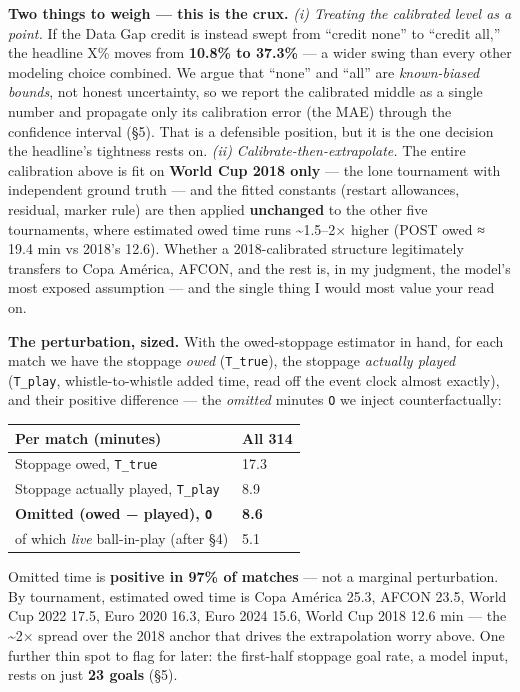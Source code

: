 \documentclass[
]{article}
\begin{document}
\textbf{Two things to weigh --- this is the crux.} \emph{(i) Treating
the calibrated level as a point.} If the Data Gap credit is instead
swept from ``credit none'' to ``credit all,'' the headline X\% moves
from \textbf{10.8\% to 37.3\%} --- a wider swing than every other
modeling choice combined. We argue that ``none'' and ``all'' are
\emph{known-biased bounds}, not honest uncertainty, so we report the
calibrated middle as a single number and propagate only its calibration
error (the MAE) through the confidence interval (§5). That is a
defensible position, but it is the one decision the headline's tightness
rests on. \emph{(ii) Calibrate-then-extrapolate.} The entire calibration
above is fit on \textbf{World Cup 2018 only} --- the lone tournament
with independent ground truth --- and the fitted constants (restart
allowances, residual, marker rule) are then applied \textbf{unchanged}
to the other five tournaments, where estimated owed time runs
\textasciitilde1.5--2× higher (POST owed ≈ 19.4 min vs 2018's 12.6).
Whether a 2018-calibrated structure legitimately transfers to Copa
América, AFCON, and the rest is, in my judgment, the model's most
exposed assumption --- and the single thing I would most value your read
on.

\textbf{The perturbation, sized.} With the owed-stoppage estimator in
hand, for each match we have the stoppage \emph{owed}
(\texttt{T\_true}), the stoppage \emph{actually played}
(\texttt{T\_play}, whistle-to-whistle added time, read off the event
clock almost exactly), and their positive difference --- the
\emph{omitted} minutes \texttt{O} we inject counterfactually:

\begin{longtable}[]{@{}ll@{}}
\toprule\noalign{}
Per match (minutes) & All 314 \\
\midrule\noalign{}
\endhead
\bottomrule\noalign{}
\endlastfoot
Stoppage owed, \texttt{T\_true} & 17.3 \\
Stoppage actually played, \texttt{T\_play} & 8.9 \\
\textbf{Omitted (owed − played), \texttt{O}} & \textbf{8.6} \\
of which \emph{live} ball-in-play (after §4) & 5.1 \\
\end{longtable}

Omitted time is \textbf{positive in 97\% of matches} --- not a marginal
perturbation. By tournament, estimated owed time is Copa América 25.3,
AFCON 23.5, World Cup 2022 17.5, Euro 2020 16.3, Euro 2024 15.6, World
Cup 2018 12.6 min --- the \textasciitilde2× spread over the 2018 anchor
that drives the extrapolation worry above. One further thin spot to flag
for later: the first-half stoppage goal rate, a model input, rests on
just \textbf{23 goals} (§5).
\end{document}

